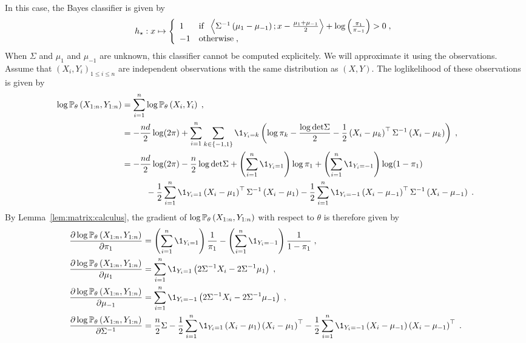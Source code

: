 In this case, the Bayes classifier is given by
\[
h_{\star}: x\mapsto  \left\{
    \begin{array}{ll}
       1 & \mbox{if }\; \left\langle \Sigma^{-1}\left(\mu_1-\mu_{-1}\right);x - \frac{\mu_1  +\mu_{-1}}{2}\right\rangle + \log\left(\frac{\pi_{1}}{\pi_{-1}}\right)>0\;, \\
        -1 & \mbox{otherwise}\;,
    \end{array}
\right.
\]
When $\Sigma$ and $\mu_1$ and $\mu_{-1}$ are unknown, this classifier cannot be computed explicitely. We will approximate it using the observations. Assume that  $(X_i,Y_i)_{1\leqslant i\leqslant n}$ are independent observations with the same distribution as $(X,Y)$. The loglikelihood of these observations is given by
\begin{align*}
\log \bP_{\theta}\left(X_{1:n},Y_{1:n}\right) &=\sum_{i=1}^n \log \bP_{\theta} \left(X_{i},Y_{i}\right)\eqsp,\\
&= - \frac{nd}{2} \log(2\pi)+\sum_{i=1}^n\sum_{k\in\{-1,1\}}\1_{Y_i=k}\left(\log \pi_{k} -\frac{\log \det \Sigma}{2} - \frac{1}{2}\left(X_i - \mu_{k}\right)^\top\Sigma^{-1}\left(X_i - \mu_{k}\right)\right) \eqsp,\\
&= - \frac{nd}{2} \log(2\pi)-\frac{n}2 \log\det\Sigma + \left(\sum_{i=1}^n\1_{Y_i=1}\right)\log \pi_1 + \left(\sum_{i=1}^n\1_{Y_i=-1}\right)\log (1-\pi_{1})\\
& \hspace{1cm}-  \frac{1}{2}\sum_{i=1}^n\1_{Y_i=1}\left(X_i - \mu_{1}\right)^\top\Sigma^{-1}\left(X_i - \mu_{1}\right) -  \frac{1}{2}\sum_{i=1}^n\1_{Y_i=-1}\left(X_i - \mu_{-1}\right)^\top\Sigma^{-1}\left(X_i - \mu_{-1}\right)\eqsp.
\end{align*}
By Lemma~\ref{lem:matrix:calculus}, the gradient of $\log \mathbb{P}_{\theta}\left(X_{1:n},Y_{1:n}\right)$ with respect to $\theta$ is therefore given by
\begin{align*}
\frac{\partial \log \bP_{\theta}\left(X_{1:n},Y_{1:n}\right)}{\partial \pi_1} &= \left(\sum_{i=1}^n\1_{Y_i=1}\right)\frac{1}{\pi_1} - \left(\sum_{i=1}^n\1_{Y_i=-1}\right)\frac{1}{1-\pi_{1}}\eqsp,\\
\frac{\partial \log \bP_{\theta}\left(X_{1:n},Y_{1:n}\right)}{\partial \mu_1} &= \sum_{i=1}^n\1_{Y_i=1}\left(2\Sigma^{-1}X_i - 2\Sigma^{-1}\mu_{1}\right)\eqsp,\\
\frac{\partial \log \bP_{\theta}\left(X_{1:n},Y_{1:n}\right)}{\partial \mu_{-1}} &= \sum_{i=1}^n\1_{Y_i=-1}\left(2\Sigma^{-1}X_i - 2\Sigma^{-1}\mu_{-1}\right)\eqsp,\\
\frac{\partial \log \bP_{\theta}\left(X_{1:n},Y_{1:n}\right)}{\partial \Sigma^{-1}} &= \frac{n}{2}\Sigma -  \frac{1}{2}\sum_{i=1}^n\1_{Y_i=1}\left(X_i - \mu_{1}\right)\left(X_i - \mu_{1}\right)^\top -  \frac{1}{2}\sum_{i=1}^n\1_{Y_i=-1}\left(X_i - \mu_{-1}\right)\left(X_i - \mu_{-1}\right)^\top\eqsp.
\end{align*}
